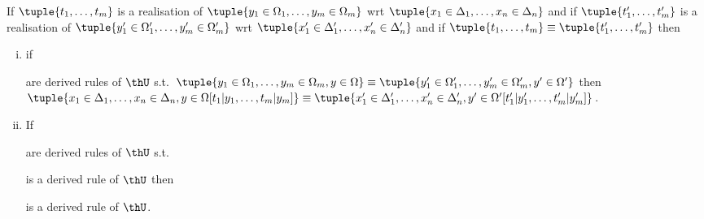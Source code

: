   \begin{lemma}
    If $\tuple{t_1, \dots, t_m}$ is a realisation of $\tuple{y_1 \in \Omega_1, \dots, y_m \in \Omega_m}$ wrt $\tuple{x_1 \in \Delta_1, \dots, x_n \in \Delta_n}$ and if $\tuple{t'_1, \dots, t'_m}$ is a realisation of $\tuple{y'_1 \in \Omega'_1, \dots, y'_m \in \Omega'_m}$ wrt $\tuple{x'_1 \in \Delta'_1, \dots, x'_n \in \Delta'_n}$ and if $\tuple{t_1, \dots, t_m} \equiv \tuple{t'_1, \dots, t'_m}$ then
    \begin{enumerate}[(i)]
      \item if
        are derived rules of $\thU$ s.t.\ $\tuple{y_1 \in \Omega_1, \dots, y_m \in \Omega_m, y \in \Omega} \equiv \tuple{y'_1 \in \Omega'_1, \dots, y'_m \in \Omega'_m, y' \in \Omega'}$ then $\tuple{x_1 \in \Delta_1, \dots, x_n \in \Delta_n, y \in \Omega[t_1|y_1, \dots, t_m|y_m]} \equiv \tuple{x'_1 \in \Delta'_1, \dots, x'_n \in \Delta'_n, y' \in \Omega'[t'_1|y'_1, \dots, t'_m|y'_m]}$.

      \item If
        are derived rules of $\thU$ s.t.\
        \begin{mathpar}
        \end{mathpar}
        is a derived rule of $\thU$ then
        \begin{mathpar}
        \end{mathpar}
        is a derived rule of $\thU$.
    \end{enumerate}
  \end{lemma}

